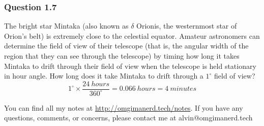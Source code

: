 \documentclass{math}
\begin{document}
\subsubsection*{Question 1.7}
The bright star Mintaka (also known as \( \delta \) Orionis, the westernmost
star of Orion's belt) is extremely close to the celestial equator. Amateur
astronomers can determine the field of view of their telescope (that is, the
angular width of the region that they can see through the telescope) by timing
how long it takes Mintaka to drift through their field of view when the
telescope is held stationary in hour angle. How long does it take Mintaka to
drift through a \( 1^{\circ} \) field of view?
\[ 1^{\circ}\times\frac{24~hours}{360^{\circ}} = 0.066~hours = 4~minutes \]

\begin{center}
  You can find all my notes at \url{http://omgimanerd.tech/notes}. If you have
  any questions, comments, or concerns, please contact me at
  alvin@omgimanerd.tech
\end{center}
\end{document}
